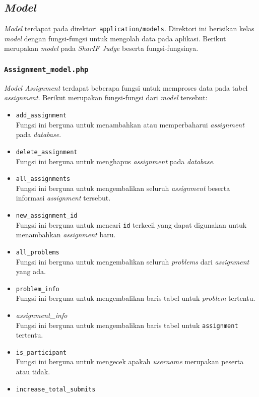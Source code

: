 \subsection{\textit{Model}}
\textit{Model} terdapat pada direktori \texttt{application/models}. Direktori ini berisikan kelas \textit{model} dengan fungsi-fungsi untuk mengolah data pada aplikasi. Berikut merupakan \textit{model} pada \textit{SharIF Judge} beserta fungsi-fungsinya.
\subsubsection{\texttt{Assignment\_model.php}}
\textit{Model Assignment} terdapat beberapa fungsi untuk memproses data pada tabel \textit{assignment}. Berikut merupakan fungsi-fungsi dari \textit{model} tersebut:
\begin{itemize}
	\item \texttt{add\_assignment}\\
	Fungsi ini berguna untuk menambahkan atau memperbaharui \textit{assignment} pada \textit{database}.
	\item \texttt{delete\_assignment}\\
	Fungsi ini berguna untuk menghapus \textit{assignment} pada \textit{database}.
	\item \texttt{all\_assignments}\\
	Fungsi ini berguna untuk mengembalikan seluruh \textit{assignment} beserta informasi \textit{assignment} tersebut.
	\item \texttt{new\_assignment\_id}\\
	Fungsi ini berguna untuk mencari \texttt{id} terkecil yang dapat digunakan untuk menambahkan \textit{assignment} baru.
	\item \texttt{all\_problems}\\
	Fungsi ini berguna untuk mengembalikan seluruh \textit{problems} dari \textit{assignment} yang ada.
	\item \texttt{problem\_info}\\
	Fungsi ini berguna untuk mengembalikan baris tabel untuk \textit{problem} tertentu.
	\item \textit{assignment\_info}\\
	Fungsi ini berguna untuk mengembalikan baris tabel untuk \texttt{assignment} tertentu.
	\item \texttt{is\_participant}\\
	Fungsi ini berguna untuk mengecek apakah \textit{username} merupakan peserta atau tidak.
	\item \texttt{increase\_total\_submits}\\

\end{itemize}
